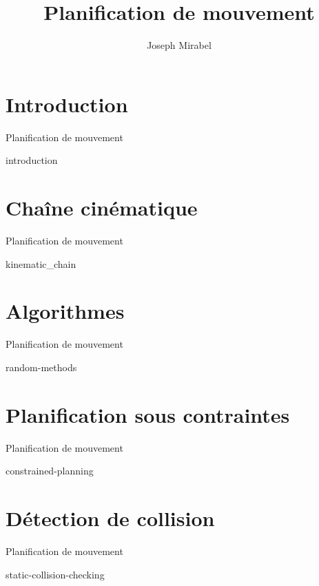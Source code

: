 \documentclass[xcolor = {svgnames,x11names}]{beamer}
\title {Planification de mouvement}
\subtitle{}
\author[]
{Joseph Mirabel}
\institute[CNRS-LAAS] %
{
  CNRS-LAAS, Toulouse, France
}
\date[] %
{}
\begin{document}
\lstset{
breakatwhitespace=true,
breaklines=true
tabsize=3, 
}

\begin{frame}
  \titlepage
\end{frame}

\section{Introduction}
\begin{frame}{Planification de mouvement}
\end{frame}
 {introduction}

\section{Cha\^ine cin\'ematique}
\begin{frame}{Planification de mouvement}
\end{frame}
 {kinematic_chain}

\section{Algorithmes}
\begin{frame}{Planification de mouvement}
\end{frame}
 {random-methods}

\section{Planification sous contraintes}
\begin{frame}{Planification de mouvement}
\end{frame}
 {constrained-planning}

\section{D\'etection de collision}
\begin{frame}{Planification de mouvement}
\end{frame}
 {static-collision-checking}
\end{document}
